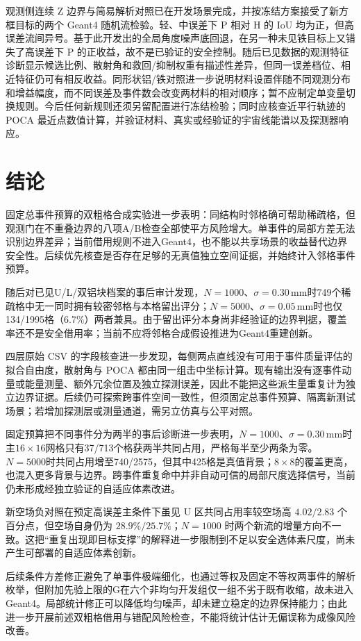 \documentclass[UTF8,fontset=none,zihao=-4,a4paper]{ctexart}
\begin{document}
观测侧连续 Z 边界与简易解析对照已在开发场景完成，并按冻结方案接受了新方框目标的两个 Geant4 随机流检验。轻、中误差下 P 相对 H 的 IoU 均为正，但高误差流间异号。基于此开发出的全局角度噪声底回退，在另一种未见铁目标上又错失了高误差下 P 的正收益，故不是已验证的安全控制。随后已见数据的观测特征诊断显示候选比例、散射角和救回/抑制权重有描述性差异，但同一误差档位、相近特征仍可有相反收益。同形状铝/铁对照进一步说明材料设置伴随不同观测分布和增益幅度，而不同误差及事件数会改变两材料的相对顺序；暂不应制定单变量切换规则。今后任何新规则还须另留配置进行冻结检验；同时应核查近平行轨迹的 POCA 最近点数值计算，并验证材料、真实或经验证的宇宙线能谱以及探测器响应。

\section{结论}
固定总事件预算的双粗格合成实验进一步表明：同结构时邻格确可帮助稀疏格，但观测门在不重叠边界的八项A/B检查全部使平方风险增大。单事件的局部方差无法识别边界差异；当前借用规则不进入Geant4，也不能以共享场景的收益替代边界安全性。后续优先核查是否存在足够的无真值独立空间证据，并始终计入邻格事件预算。

随后对已见U/L/双铝块档案的事后审计发现，$N=1000$、$\sigma=0.30\,\mathrm{mm}$时749个稀疏格中无一同时拥有较密邻格与本格留出评分；$N=5000$、$\sigma=0.05\,\mathrm{mm}$时也仅134/1995格（6.7\%）两者兼具。由于留出评分本身尚非经验证的边界判据，覆盖率还不是安全借用率；当前不应将邻格合成假设推进为Geant4重建创新。

四层原始 CSV 的字段核查进一步发现，每侧两点直线没有可用于事件质量评估的拟合自由度，散射角与 POCA 都由同一组击中坐标计算。现有输出没有逐事件动量或能量测量、额外冗余位置及独立探测误差，因此不能把这些派生量重复计为独立边界证据。后续仍可探索跨事件空间一致性，但须固定总事件预算、隔离新测试场景；若增加探测层或测量通道，需另立仿真与公平对照。

固定预算把不同事件分为两半的事后诊断进一步表明，$N=1000$、$\sigma=0.30\,\mathrm{mm}$时主$16\times16$网格只有37/713个格获两半共同占用，严格每半至少两条为零。$N=5000$时共同占用增至740/2575，但其中425格是真值背景；$8\times8$的覆盖更高，也混入更多背景与边界。跨事件重复命中并非自动可信的局部尺度选择信号，当前仍未形成经独立验证的自适应体素改进。

新空场负对照在预定高误差主条件下虽见 U 区共同占用率较空场高 $4.02/2.83$ 个百分点，但空场自身仍为 $28.9\%/25.7\%$；$N=1000$ 时两个新流的增量方向不一致。这把“重复出现即目标支撑”的解释进一步限制到不足以安全选体素尺度，尚未产生可部署的自适应体素创新。

后续条件方差修正避免了单事件极端细化，也通过等权及固定不等权两事件的解析枚举，但附加先验上限的G在六个非均匀开发组仅一组不劣于既有收缩，故未进入Geant4。局部统计修正可以降低均匀噪声，却未建立稳定的边界保持能力；由此进一步开展前述双粗格借用与错配风险检查，不能将统计估计无偏误称为成像风险改善。
\end{document}
